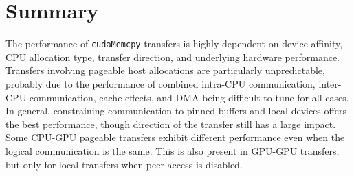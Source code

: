 \section{Summary}

The performance of \texttt{cudaMemcpy} transfers is highly dependent on device affinity, CPU allocation type, transfer direction, and underlying hardware performance.
Transfers involving pageable host allocations are particularly unpredictable, probably due to the performance of combined intra-CPU communication, inter-CPU communication, cache effects, and DMA being difficult to tune for all cases.
In general, constraining communication to pinned buffers and local devices offers the best performance, though direction of the transfer still has a large impact.
Some CPU-GPU pageable transfers exhibit different performance even when the logical communication is the same.
This is also present in GPU-GPU transfers, but only for local transfers when peer-access is disabled.
